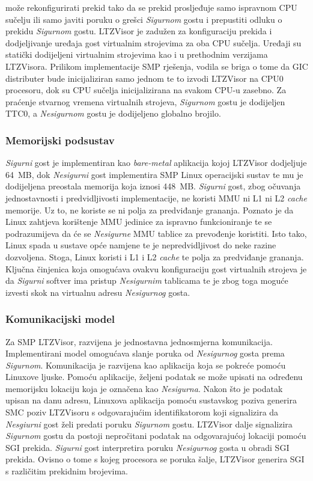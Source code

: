 \documentclass[times, utf8, diplomski, numeric]{fer}
\begin{document}
može rekonfigurirati prekid tako da se prekid prosljeđuje samo ispravnom CPU sučelju ili samo javiti poruku o grešci
\textit{Sigurnom} gostu i prepustiti odluku o prekidu \textit{Sigurnom} gostu. LTZVisor je zadužen za konfiguraciju prekida
i dodjeljivanje uređaja gost virtualnim strojevima za oba CPU sučelja. Uređaji su statički dodijeljeni virtualnim strojevima
kao i u prethodnim verzijama LTZVisora. Prilikom implementacije SMP rješenja, vodila se briga
o tome da GIC distributer bude inicijaliziran samo jednom te to izvodi LTZVisor na CPU0 procesoru, dok su CPU sučelja
inicijalizirana na svakom CPU-u zasebno. Za praćenje stvarnog vremena virtualnih strojeva, \textit{Sigurnom} gostu je
dodijeljen TTC0, a \textit{Nesigurnom} gostu je dodijeljeno globalno brojilo.

\subsubsection{Memorijski podsustav}
\textit{Sigurni} gost je implementiran kao \textit{bare-metal} aplikacija kojoj LTZVisor dodjeljuje 64~MB, dok
\textit{Nesigurni} gost implementira SMP Linux operacijski sustav te mu je dodijeljena preostala memorija koja iznosi 448~MB.
\textit{Sigurni} gost, zbog očuvanja jednostavnosti i predvidljivosti implementacije, ne koristi MMU ni L1 ni L2 \textit{cache}
memorije. Uz to, ne koriste se ni polja za predviđanje grananja. Poznato je da Linux zahtjeva korištenje MMU jedinice za
ispravno funkcioniranje te se podrazumijeva da će se \textit{Nesigurne} MMU tablice za prevođenje koristiti. Isto tako, Linux
spada u sustave opće namjene te je nepredvidljivost do neke razine dozvoljena. Stoga, Linux koristi i L1 i L2 \textit{cache} te
polja za predviđanje grananja. Ključna činjenica koja omogućava ovakvu konfiguraciju gost virtualnih strojeva je da
\textit{Sigurni} softver ima pristup \textit{Nesigurnim} tablicama te je zbog toga moguće izvesti skok na virtualnu adresu
\textit{Nesigurnog} gosta.

\subsubsection{Komunikacijski model}
Za SMP LTZVisor, razvijena je jednostavna jednosmjerna komunikacija. Implementirani model omogućava slanje poruka od
\textit{Nesigurnog} gosta prema \textit{Sigurnom}. Komunikacija je razvijena kao aplikacija koja se pokreće pomoću Linuxove
ljuske. Pomoću aplikacije, željeni podatak se može upisati na određenu memorijsku lokaciju koja je označena kao
\textit{Nesigurna}. Nakon što je podatak upisan na danu adresu, Linuxova aplikacija pomoću sustavskog poziva generira
SMC poziv LTZVisoru s odgovarajućim identifikatorom koji signalizira da \textit{Nesgiurni} gost želi predati poruku
\textit{Sigurnom} gostu. LTZVisor dalje signalizira \textit{Sigurnom} gostu da postoji nepročitani podatak na odgovarajućoj
lokaciji pomoću SGI prekida. \textit{Sigurni} gost interpretira poruku \textit{Nesigurnog} gosta u obradi SGI prekida.
Ovisno o tome s kojeg procesora se poruka šalje, LTZVisor generira SGI s različitim prekidnim brojevima.
\end{document}
